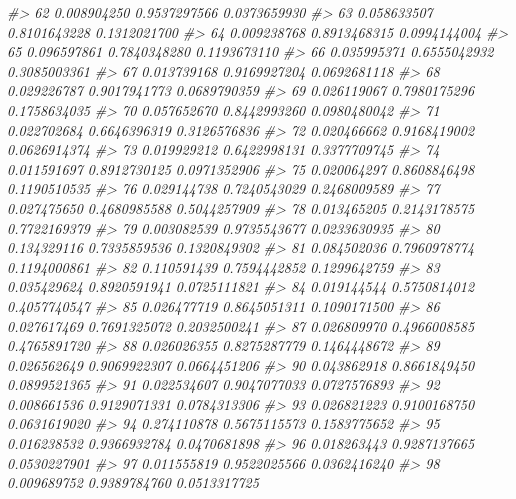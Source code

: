 \documentclass[
  oneside]{book}
\newenvironment{Shaded}{\begin{snugshade}}{\end{snugshade}}
\newcommand{\CommentTok}[1]{\textcolor[rgb]{0.56,0.35,0.01}{\textit{#1}}}
\begin{document}
\begin{Shaded}
\begin{Highlighting}[]
\CommentTok{\#\textgreater{} 62  0.008904250 0.9537297566 0.0373659930}
\CommentTok{\#\textgreater{} 63  0.058633507 0.8101643228 0.1312021700}
\CommentTok{\#\textgreater{} 64  0.009238768 0.8913468315 0.0994144004}
\CommentTok{\#\textgreater{} 65  0.096597861 0.7840348280 0.1193673110}
\CommentTok{\#\textgreater{} 66  0.035995371 0.6555042932 0.3085003361}
\CommentTok{\#\textgreater{} 67  0.013739168 0.9169927204 0.0692681118}
\CommentTok{\#\textgreater{} 68  0.029226787 0.9017941773 0.0689790359}
\CommentTok{\#\textgreater{} 69  0.026119067 0.7980175296 0.1758634035}
\CommentTok{\#\textgreater{} 70  0.057652670 0.8442993260 0.0980480042}
\CommentTok{\#\textgreater{} 71  0.022702684 0.6646396319 0.3126576836}
\CommentTok{\#\textgreater{} 72  0.020466662 0.9168419002 0.0626914374}
\CommentTok{\#\textgreater{} 73  0.019929212 0.6422998131 0.3377709745}
\CommentTok{\#\textgreater{} 74  0.011591697 0.8912730125 0.0971352906}
\CommentTok{\#\textgreater{} 75  0.020064297 0.8608846498 0.1190510535}
\CommentTok{\#\textgreater{} 76  0.029144738 0.7240543029 0.2468009589}
\CommentTok{\#\textgreater{} 77  0.027475650 0.4680985588 0.5044257909}
\CommentTok{\#\textgreater{} 78  0.013465205 0.2143178575 0.7722169379}
\CommentTok{\#\textgreater{} 79  0.003082539 0.9735543677 0.0233630935}
\CommentTok{\#\textgreater{} 80  0.134329116 0.7335859536 0.1320849302}
\CommentTok{\#\textgreater{} 81  0.084502036 0.7960978774 0.1194000861}
\CommentTok{\#\textgreater{} 82  0.110591439 0.7594442852 0.1299642759}
\CommentTok{\#\textgreater{} 83  0.035429624 0.8920591941 0.0725111821}
\CommentTok{\#\textgreater{} 84  0.019144544 0.5750814012 0.4057740547}
\CommentTok{\#\textgreater{} 85  0.026477719 0.8645051311 0.1090171500}
\CommentTok{\#\textgreater{} 86  0.027617469 0.7691325072 0.2032500241}
\CommentTok{\#\textgreater{} 87  0.026809970 0.4966008585 0.4765891720}
\CommentTok{\#\textgreater{} 88  0.026026355 0.8275287779 0.1464448672}
\CommentTok{\#\textgreater{} 89  0.026562649 0.9069922307 0.0664451206}
\CommentTok{\#\textgreater{} 90  0.043862918 0.8661849450 0.0899521365}
\CommentTok{\#\textgreater{} 91  0.022534607 0.9047077033 0.0727576893}
\CommentTok{\#\textgreater{} 92  0.008661536 0.9129071331 0.0784313306}
\CommentTok{\#\textgreater{} 93  0.026821223 0.9100168750 0.0631619020}
\CommentTok{\#\textgreater{} 94  0.274110878 0.5675115573 0.1583775652}
\CommentTok{\#\textgreater{} 95  0.016238532 0.9366932784 0.0470681898}
\CommentTok{\#\textgreater{} 96  0.018263443 0.9287137665 0.0530227901}
\CommentTok{\#\textgreater{} 97  0.011555819 0.9522025566 0.0362416240}
\CommentTok{\#\textgreater{} 98  0.009689752 0.9389784760 0.0513317725}

\end{Highlighting}
\end{Shaded}
\end{document}
